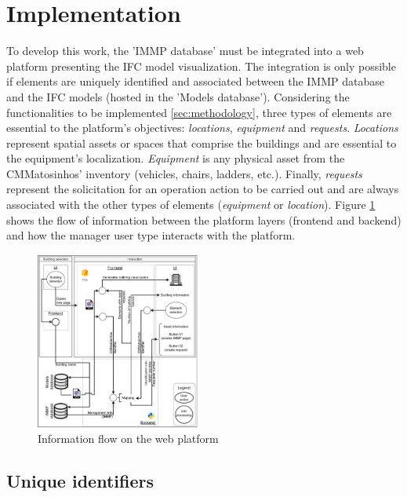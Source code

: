 \documentclass[a4paper, 10pt, twocolumn, twoside]{article}
\begin{document}
\section{Implementation}
\label{sec:implementation}

To develop this work, the 'IMMP database' must be integrated into a web platform presenting the IFC model visualization. The integration is only possible if elements are uniquely identified and associated between the IMMP database and the IFC models (hosted in the 'Models database'). Considering the functionalities to be implemented \ref{sec:methodology}, three types of elements are essential to the platform's objectives: \emph{locations}, \emph{equipment} and \emph{requests}. \emph{Locations} represent spatial assets or spaces that comprise the buildings and are essential to the equipment's localization. \emph{Equipment} is any physical asset from the CMMatosinhos' inventory (vehicles, chairs, ladders, etc.). Finally, \emph{requests} represent the solicitation for an operation action to be carried out and are always associated with the other types of elements (\emph{equipment} or \emph{location}). Figure \ref{fig_fluxo} shows the flow of information between the platform layers (frontend and backend) and how the manager user type interacts with the platform.

\begin{figure}[!htb]
    \centering
    \includegraphics[width=0.48\textwidth]{Images/fluxo.pdf}
    \caption{Information flow on the web platform}
    \label{fig_fluxo}
\end{figure}

\subsection{Unique identifiers}
\label{subsec:identifiers}
\end{document}

